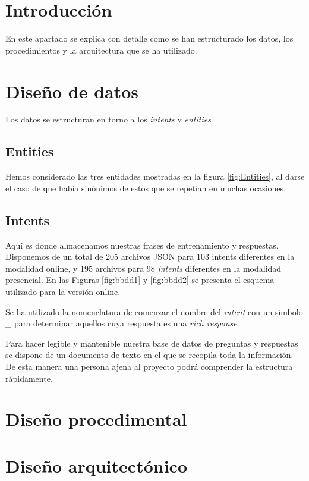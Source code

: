 
\section{Introducción}

En este apartado se explica con detalle como se han estructurado los datos, los procedimientos y la arquitectura que se ha utilizado.

\section{Diseño de datos}

Los datos se estructuran en torno a los \textit{intents} y \textit{entities}.

\subsection{Entities}

Hemos considerado las tres entidades mostradas en la figura \ref{fig:Entities}, al darse el caso de que había sinónimos de estos que se repetían en muchas ocasiones.


\subsection{Intents}

Aquí es donde almacenamos nuestras frases de entrenamiento y respuestas. Disponemos de un total de 205 archivos JSON para 103 intents diferentes en la modalidad online, y 195 archivos para 98 \textit{intents} diferentes en la modalidad presencial. En las Figuras \ref{fig:bbdd1} y \ref{fig:bbdd2} se presenta el esquema utilizado para la versión online.



Se ha utilizado la nomenclatura de comenzar el nombre del \textit{intent} con un simbolo \textit{\_} para determinar aquellos cuya respuesta es una \textit{rich response}.

\newpage
Para hacer legible y mantenible nuestra base de datos de preguntas y respuestas se dispone de un documento de texto en el que se recopila toda la información. De esta manera una persona ajena al proyecto podrá comprender la estructura rápidamente.



\section{Diseño procedimental}

\section{Diseño arquitectónico}


